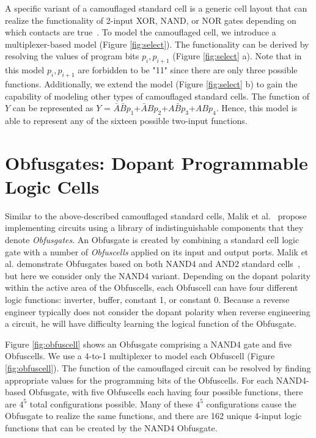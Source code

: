 \documentclass[proposal]{umassthesis}  %
\begin{document}
A specific variant of a camouflaged standard cell is a generic cell layout that can realize the functionality of 2-input XOR, NAND, or NOR gates depending on which contacts are true~\cite{rajendran-13}. To model the camouflaged cell, we introduce a multiplexer-based model (Figure \ref{fig:select}). The functionality can be derived by resolving the values of program bits $p_{i},p_{i+1}$ (Figure \ref{fig:select} a). Note that in this model $p_{i},p_{i+1}$ are forbidden to be "11" since there are only three possible functions. Additionally, we extend the model (Figure \ref{fig:select} b) to gain the capability of modeling other types of camouflaged standard cells. The function of $Y$ can be represented as $Y$ = $\bar{A}\bar{B}p_{1}$+$\bar{A}Bp_{2}$+$A\bar{B}p_{3}$+$ABp_{4}$. Hence, this model is able to represent any of the sixteen possible two-input functions. 


















\section{Obfusgates: Dopant Programmable Logic Cells}

Similar to the above-described camouflaged standard cells, Malik et al.~\cite{malik-obfusgate} propose implementing circuits using a library of indistinguishable components that they denote \textit{Obfusgates}. An Obfusgate is created by combining a standard cell logic gate with a number of \textit{Obfuscells} applied on its input and output ports. Malik et al. demonstrate Obfusgates based on both NAND4 and AND2 standard cells~\cite{malik-obfusgate}, but here we consider only the NAND4 variant. Depending on the dopant polarity within the active area of the Obfuscells, each Obfuscell can have four different logic functions: inverter, buffer, constant 1, or constant 0. Because a reverse engineer typically does not consider the dopant polarity when reverse engineering a circuit, he will have difficulty learning the logical function of the Obfusgate.

Figure \ref{fig:obfuscell} shows an Obfusgate comprising a NAND4 gate and five Obfuscells. We use a 4-to-1 multiplexer to model each Obfuscell (Figure \ref{fig:obfuscell}). The function of the camouflaged circuit can be resolved by finding appropriate values for the programming bits of the Obfuscells. For each NAND4-based Obfusgate, with five Obfuscells each having four possible functions, there are $4^{5}$ total configurations possible. Many of these $4^{5}$ configurations cause the Obfusgate to realize the same functions, and there are 162 unique 4-input logic functions that can be created by the NAND4 Obfusgate.
\end{document}
